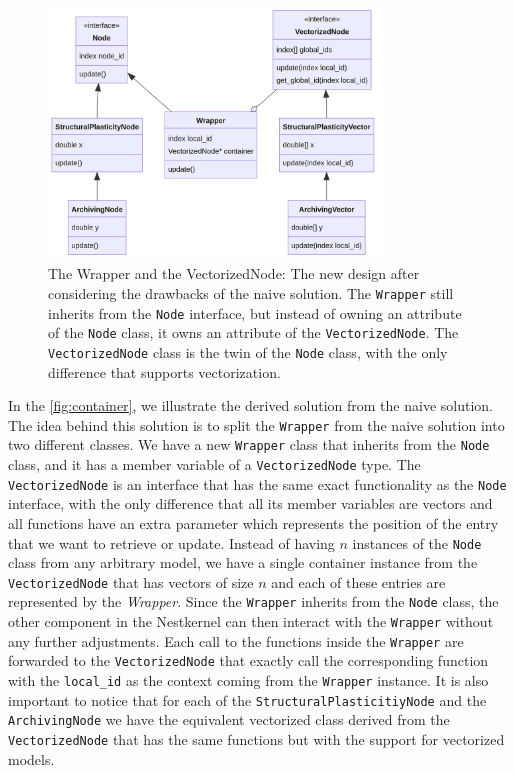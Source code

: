 \begin{figure}[h!]
\centering
\includegraphics[width=0.8\textwidth]{src/pic/wrapper_node.png}
\caption{The Wrapper and the VectorizedNode: The new design after considering the drawbacks of the naive solution. The \texttt{Wrapper} still inherits from the \texttt{Node} interface, but instead of owning an attribute of the \texttt{Node} class, it owns an attribute of the \texttt{VectorizedNode}. The \texttt{VectorizedNode} class is the twin of the \texttt{Node} class, with the only difference that supports vectorization.}
\label{fig:container}
\end{figure}

In the \autoref{fig:container}, we illustrate the derived solution from the naive solution. The idea behind this solution is to split the \texttt{Wrapper} from the naive solution into two different classes. We have a new \texttt{Wrapper} class that inherits from the \texttt{Node} class, and it has a member variable of a \texttt{VectorizedNode} type. The \texttt{VectorizedNode}  is an interface that has the same exact functionality as the \texttt{Node} interface, with the only difference that all its member variables are vectors and all functions have an extra parameter which represents the position of the entry that we want to retrieve or update. Instead of having $n$ instances of the \texttt{Node} class from any arbitrary model, we have a single container instance from  the \texttt{VectorizedNode} that has vectors of size $n$ and each of these entries are represented by the \emph{Wrapper}. Since the \texttt{Wrapper} inherits from the \texttt{Node} class, the other component in the Nestkernel can then interact with the \texttt{Wrapper} without any further adjustments. Each call to the functions inside the \texttt{Wrapper} are forwarded to the \texttt{VectorizedNode} that exactly call the corresponding function with the \texttt{local\_id} as the context coming from the \texttt{Wrapper} instance. It is also important to notice that for each of the \texttt{StructuralPlasticitiyNode} and the \texttt{ArchivingNode} we have the equivalent vectorized class derived from the \texttt{VectorizedNode} that has the same functions but with the support for vectorized models.


